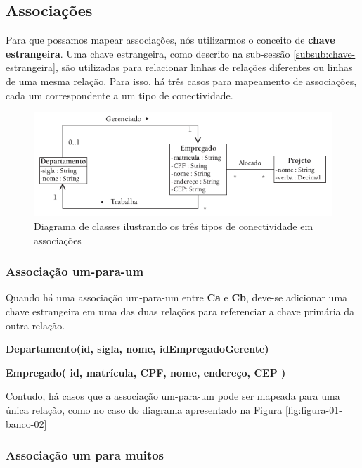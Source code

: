 \subsection{Associações}

Para que possamos mapear associações, nós utilizarmos o conceito de \textbf{chave estrangeira}. Uma chave estrangeira, como descrito na sub-sessão \ref{subsub:chave-estrangeira}, são utilizadas para relacionar linhas de relações diferentes ou linhas de uma mesma relação. Para isso, há três casos para mapeamento de associações, cada um correspondente a um tipo de conectividade.

\begin{figure}[H]
	\centering
	\includegraphics[scale=0.8]{imagens/tipos-de-conectividade.png}
	\caption{Diagrama de classes ilustrando os três tipos de conectividade em associações}
	\label{fig:figura-01-banco-04}
\end{figure}

\subsubsection{Associação um-para-um}

Quando há uma associação um-para-um entre \textbf{Ca} e \textbf{Cb}, deve-se adicionar uma chave estrangeira em uma das duas relações para referenciar a chave primária da outra relação.

\textbf{Departamento(id, sigla, nome, idEmpregadoGerente)}

\textbf{Empregado( id, matrícula, CPF, nome, endereço, CEP )}

Contudo, há casos que a associação um-para-um pode ser mapeada para uma única relação, como no caso do diagrama apresentado na Figura \ref{fig:figura-01-banco-02}

\subsubsection{Associação um para muitos}